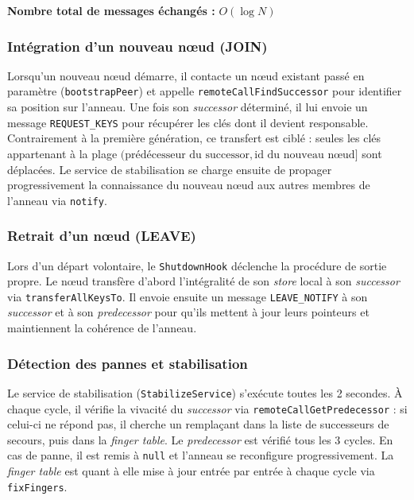 \textbf{Nombre total de messages \'echang\'es :} \(O(\log N)\)


\subsubsection{Int\'egration d'un nouveau n\oe ud (JOIN)}

Lorsqu'un nouveau n\oe ud d\'emarre, il contacte un n\oe ud existant pass\'e en param\`etre (\texttt{bootstrapPeer}) et appelle \texttt{remoteCallFindSuccessor} pour identifier sa position sur l'anneau. Une fois son \emph{successor} d\'etermin\'e, il lui envoie un message \texttt{REQUEST\_KEYS} pour r\'ecup\'erer les cl\'es dont il devient responsable. Contrairement \`a la premi\`ere g\'en\'eration, ce transfert est cibl\'e : seules les cl\'es appartenant \`a la plage \((\text{pr\'ed\'ecesseur du successor}, \text{id du nouveau n\oe ud}]\) sont d\'eplac\'ees. Le service de stabilisation se charge ensuite de propager progressivement la connaissance du nouveau n\oe ud aux autres membres de l'anneau via \texttt{notify}.

\subsubsection{Retrait d'un n\oe ud (LEAVE)}

Lors d'un d\'epart volontaire, le \texttt{ShutdownHook} d\'eclenche la proc\'edure de sortie propre. Le n\oe ud transf\`ere d'abord l'int\'egralit\'e de son \emph{store} local \`a son \emph{successor} via \texttt{transferAllKeysTo}. Il envoie ensuite un message \texttt{LEAVE\_NOTIFY} \`a son \emph{successor} et \`a son \emph{predecessor} pour qu'ils mettent \`a jour leurs pointeurs et maintiennent la coh\'erence de l'anneau.

\subsubsection{D\'etection des pannes et stabilisation}

Le service de stabilisation (\texttt{StabilizeService}) s'ex\'ecute toutes les 2 secondes. \`A chaque cycle, il v\'erifie la vivacit\'e du \emph{successor} via \texttt{remoteCallGetPredecessor} : si celui-ci ne r\'epond pas, il cherche un rempla\c{c}ant dans la liste de successeurs de secours, puis dans la \emph{finger table}. Le \emph{predecessor} est v\'erifi\'e tous les 3 cycles. En cas de panne, il est remis \`a \texttt{null} et l'anneau se reconfigure progressivement. La \emph{finger table} est quant \`a elle mise \`a jour entr\'ee par entr\'ee \`a chaque cycle via \texttt{fixFingers}.

